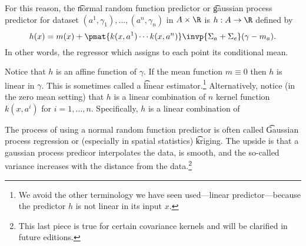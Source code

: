 For this reason, the \t{normal random function predictor} or \t{gaussian process predictor} for dataset $(a^1, \gamma _1), \dots , (a^n, \gamma _n)$ in $A \times \R $ is $h: A \to \R $ defined by
\[
h(x) = m(x) + \pmat{k(x,a^1) \cdots k(x, a^n)}\invp{\Sigma _{a} + \Sigma _{e}}(\gamma  - m_{a}).
\]
In other words, the regressor which assigns to each point its conditional mean.

Notice that $h$ is an affine function of $\gamma $.
If the mean function $m \equiv 0$ then $h$ is linear in $\gamma $.
This is sometimes called a \t{linear estimator}.\footnote{We avoid the other terminology we have seen used---linear predictor---because the predictor $h$ is not linear in its input $x$.}
Alternatively, notice (in the zero mean setting) that $h$ is a linear combination of $n$ kernel function $k(x, a^i)$ for $i = 1, \dots , n$.
Specifically, $h$ is a linear combination of

The process of using a normal random function predictor is often called \t{Gaussian process regression} or (especially in spatial statistics) \t{kriging}.
The upside is that a gaussian process predicor interpolates the data, is smooth, and the so-called variance increases with the distance from the data.\footnote{This last piece is true for certain covariance kernels and will be clarified in future editions.}
